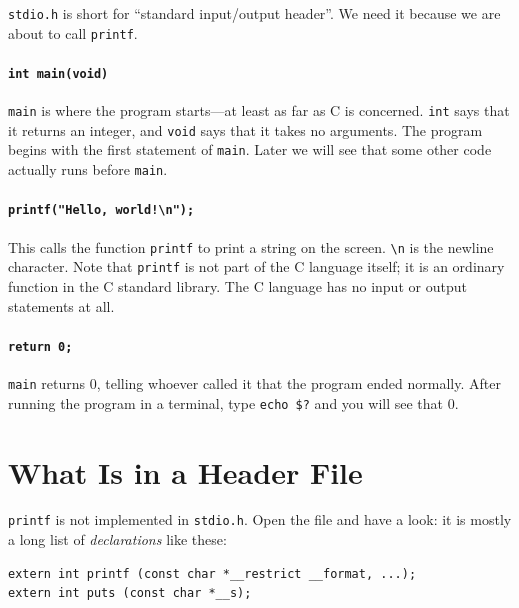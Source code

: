 \texttt{stdio.h} is short for ``standard input/output header''. We need it because we are about to call \texttt{printf}.

\paragraph{\texttt{int main(void)}}
\texttt{main} is where the program starts---at least as far as C is concerned. \texttt{int} says that it returns an integer, and \texttt{void} says that it takes no arguments. The program begins with the first statement of \texttt{main}. Later we will see that some other code actually runs before \texttt{main}.

\paragraph{\texttt{printf("Hello, world!\textbackslash n");}}
This calls the function \texttt{printf} to print a string on the screen. \texttt{\textbackslash n} is the newline character. Note that \texttt{printf} is not part of the C language itself; it is an ordinary function in the C standard library. The C language has no input or output statements at all.

\paragraph{\texttt{return 0;}}
\texttt{main} returns 0, telling whoever called it that the program ended normally. After running the program in a terminal, type \texttt{echo \$?} and you will see that 0.

\section{What Is in a Header File}
\label{sec:stdio-h}

\texttt{printf} is not implemented in \texttt{stdio.h}. Open the file and have a look: it is mostly a long list of \emph{declarations} like these:
\begin{verbatim}
extern int printf (const char *__restrict __format, ...);
extern int puts (const char *__s);
\end{verbatim}

